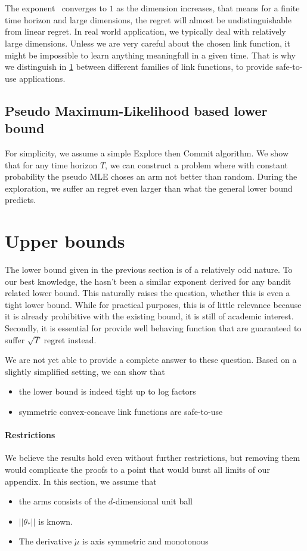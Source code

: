 \documentclass[twoside]{article} \usepackage{aistats2017}
\begin{document}
The exponent $\frac{}{}$ converges to $1$ as the dimension increases, that means for a finite time horizon and large dimensions, the regret will almost be undistinguishable from linear regret. 
In real world application, we typically deal with relatively large dimensions. 
Unless we are very careful about the chosen link function, it might be impossible to learn anything meaningfull in a given time.
That is why we distinguish in \ref{upperBounds} between different families of link functions, to provide safe-to-use applications.

\subsection{Pseudo Maximum-Likelihood based lower bound}
For simplicity, we assume a simple Explore then Commit algorithm. 
We show that for any time horizon $T$, we can construct a problem where with constant probability the pseudo MLE choses an arm not better than random.
During the exploration, we suffer an regret even larger than what the general lower bound predicts.

\section{Upper bounds}\label{upperBounds}
The lower bound given in the previous section is of a relatively odd nature. 
To our best knowledge, the hasn't been a similar exponent derived for any bandit related lower bound.
This naturally raises the question, whether this is even a tight lower bound.
While for practical purposes, this is of little relevance because it is already prohibitive with the existing bound, it is still of academic interest.
Secondly, it is essential for provide well behaving function that are guaranteed to suffer $\sqrt{T}$ regret instead.

We are not yet able to provide a complete answer to these question. 
Based on a slightly simplified setting, we can show that
\begin{itemize}
\item the lower bound is indeed tight up to log factors
\item symmetric convex-concave link functions are safe-to-use
\end{itemize}

\paragraph{Restrictions}
We believe the results hold even without further restrictions, but removing them would complicate the proofs to a point that would burst all limits of our appendix.
In this section, we assume that
\begin{itemize}
\item the arms consists of the $d$-dimensional unit ball
\item $||\theta_*||$ is known.
\item The derivative $\dot{\mu}$ is axis symmetric and monotonous
\end{itemize}
\end{document}

